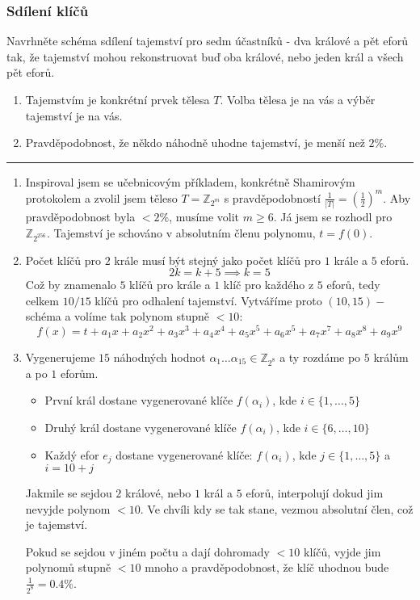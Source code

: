 \documentclass[10pt,a4paper]{article}
\newcommand{\Z}{{\mathbb{Z}}}       %
\newcommand{\hr}{{\begin{center}\par\rule{\textwidth}{0.5pt} \end{center}}}
\begin{document}
\subsubsection{Sdílení klíčů}
Navrhněte schéma sdílení tajemství pro sedm účastníků - 
dva králové a pět eforů tak, že tajemství mohou rekonstruovat buď oba králové, nebo jeden král a všech pět eforů.
\begin{enumerate}[label=(\alph*)]
    \item Tajemstvím je konkrétní prvek tělesa $T$. Volba tělesa je na vás a výběr tajemství je na vás.
    \item Pravděpodobnost, že někdo náhodně uhodne tajemství, je menší než $2\%$.
\end{enumerate}
\hr

\begin{enumerate}
    \item Inspiroval jsem se učebnicovým příkladem, konkrétně Shamirovým protokolem a zvolil jsem těleso $T=\Z_{2^m}$ s pravděpodobností $\frac{1}{|T|}=(\frac{1}2)^m$.
    Aby pravděpodobnost byla $<2\%$, musíme volit $m\geq6$. Já jsem se rozhodl pro $\Z_{2^{256}}$. Tajemství je schováno v absolutním členu polynomu, $t=f(0)$.
    \item Počet klíčů pro $2$ krále musí být stejný jako počet klíčů pro $1$ krále a $5$ eforů. 
    $$2k = k+5 \implies k=5$$
    Což by znamenalo $5$ klíčů pro krále a $1$ klíč pro každého z $5$ eforů, tedy celkem $10/15$ klíčů pro odhalení tajemství.
    Vytváříme proto $(10,15)-$schéma a volíme tak polynom stupně $<10$: 
    $$f(x) = t + a_1x + a_2x^2 + a_3x^3+a_4x^4+a_5x^5 + a_6 x^5 + a_7 x^7 + a_8x^8 + a_9x^9$$
    
    \item Vygenerujeme $15$ náhodných hodnot $\alpha_1 \dots \alpha_{15} \in \Z_{2^8}$ a ty rozdáme po $5$ králům a po $1$ eforům.
    \begin{itemize}
        \item První král dostane vygenerované klíče $f(\alpha_i)$, kde $i \in \{1, \dots, 5\}$
        \item Druhý král dostane vygenerované klíče $f(\alpha_i)$, kde $i \in \{6, \dots, 10\}$
        \item Každý efor $e_j$ dostane vygenerované klíče: $f(\alpha_i)$, kde $j \in \{1, \dots, 5\}$ a $i = 10+j$
    \end{itemize}
    Jakmile se sejdou $2$ králové, nebo $1$ král a $5$ eforů, interpolují dokud jim nevyjde polynom $<10$. Ve chvíli kdy se tak stane, vezmou absolutní člen, což je tajemství.

    Pokud se sejdou v jiném počtu a dají dohromady $<10$ klíčů, vyjde jim polynomů stupně $<10$ mnoho a pravděpodobnost, že klíč uhodnou bude $\frac{1}{2^8} = 0.4\%$.
\end{enumerate}
\end{document}
